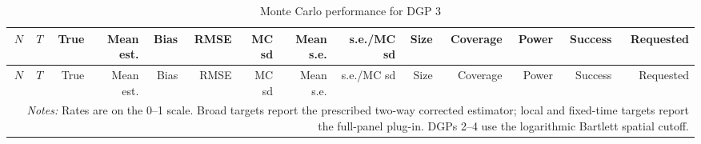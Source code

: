\begingroup
\small
\begin{longtable}{rrrrrrrrrrrrrr}
\caption{Monte Carlo performance for DGP 3}\label{tab:mc-dgp3}\\
\toprule
$N$ & $T$ & True & Mean est. & Bias & RMSE & MC sd & Mean s.e. & s.e./MC sd & Size & Coverage & Power & Success & Requested \\
\midrule
\endfirsthead
\toprule
$N$ & $T$ & True & Mean est. & Bias & RMSE & MC sd & Mean s.e. & s.e./MC sd & Size & Coverage & Power & Success & Requested \\
\midrule
\endhead
\bottomrule
\multicolumn{14}{p{0.96\linewidth}}{\footnotesize \textit{Notes:} Rates are on the 0--1 scale. Broad targets report the prescribed two-way corrected estimator; local and fixed-time targets report the full-panel plug-in. DGPs 2--4 use the logarithmic Bartlett spatial cutoff.} \\
\end{longtable}
\endgroup
